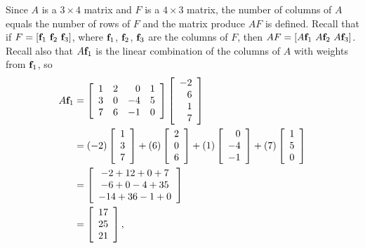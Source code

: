 \begin{example}
\ExampleSolution
\ba
\item Since $A$ is a $3 \times 4$ matrix and $F$ is a $4 \times 3$ matrix, the number of columns of $A$ equals the number of rows of $F$ and the matrix produce $AF$ is defined. Recall that if $F = [\mathbf{f}_1 \ \mathbf{f}_2 \ \mathbf{f}_3]$, where $\mathbf{f}_1$, $\mathbf{f}_2$, $\mathbf{f}_3$ are the columns of $F$, then $AF = [A\mathbf{f}_1 \ A\mathbf{f}_2 \ A\mathbf{f}_3]$. Recall also that $A \mathbf{f}_1$ is the linear combination of the columns of $A$ with weights from $\mathbf{f}_1$, so 
\begin{align*}
A\mathbf{f}_1 &= \left[ \begin{array}{ccrc} 1&2&0&1\\3&0&-4&5\\7&6&-1&0 \end{array} \right] \left[ \begin{array}{r} -2\\6\\1\\7 \end{array} \right] \\
	&= (-2) \left[ \begin{array}{c} 1\\3\\7 \end{array} \right]  + (6)  \left[ \begin{array}{c} 2\\0\\6 \end{array} \right]  + (1)  \left[ \begin{array}{r} 0\\-4\\-1 \end{array} \right] + (7)  \left[ \begin{array}{c} 1\\5\\0 \end{array} \right] \\
	&=  \left[ \begin{array}{c} -2+12+0+7 \\ -6+0-4+35 \\ -14+36-1+0\end{array} \right] \\
	&=  \left[ \begin{array}{c} 17\\25\\21 \end{array} \right],
\end{align*}
\begin{align*}

\end{align*}
\end{example}
